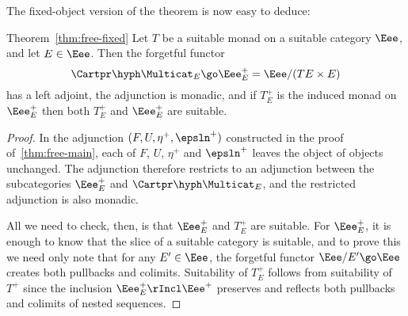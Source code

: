 The fixed-object version of the theorem is now easy to deduce:
%
\begin{quotedthm}{Theorem~\ref{thm:free-fixed}}
Let $T$ be a suitable monad on a suitable category $\Eee$, and let $E \in
\Eee$.  Then the forgetful functor
\[
\Cartpr\hyph\Multicat_E \go \Eee^+_E = \Eee/(TE \times E)
\]
has a left adjoint, the adjunction is monadic, and if $T^+_E$ is the induced
monad on $\Eee^+_E$ then both $T^+_E$ and $\Eee^+_E$ are suitable.
\end{quotedthm}
%
\begin{proof}
In the adjunction $(F,U,\eta^+,\epsln^+)$ constructed in the proof
of~\ref{thm:free-main}, each of $F$, $U$, $\eta^+$ and $\epsln^+$ leaves
the object of objects unchanged.  The adjunction therefore restricts to an
adjunction between the subcategories $\Eee^+_E$ and
$\Cartpr\hyph\Multicat_E$, and the restricted adjunction is also monadic.

All we need to check, then, is that $\Eee^+_E$ and $T^+_E$ are suitable.
For $\Eee^+_E$, it is enough to know that the slice of a suitable category
is suitable, and to prove this we need only note that for any $E' \in
\Eee$, the forgetful functor $\Eee/E' \go \Eee$ creates both pullbacks and
colimits.  Suitability of $T^+_E$ follows from suitability of $T^+$ since
the inclusion $\Eee^+_E \rIncl \Eee^+$ preserves and reflects both
pullbacks and colimits of nested sequences.  \done
\end{proof}

